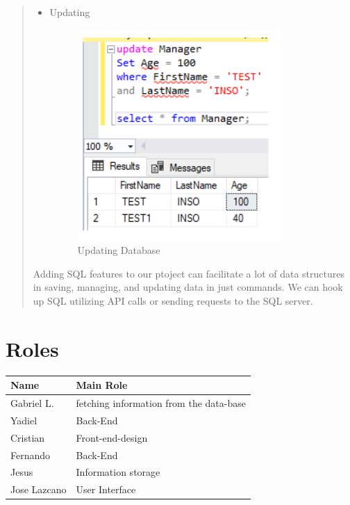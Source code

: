 \documentclass{article}
\begin{document}
\begin{quote}
\begin{itemize}
      \vspace{160}

      \item Updating
      \begin{figure}[h!]
          \centering
          \includegraphics[scale=0.5]{Images/updating.png}
          \caption{Updating Database}
          \label{fig:figure 14}
      \end{figure}

    \end{itemize}

   Adding SQL features to our ptoject can facilitate a lot of data structures in saving, managing, and updating data in just commands. We can hook up SQL utilizing API calls or sending requests to the SQL server.
\end{quote}

\section{Roles}
\vspace{10}
\begin{center}

\begin{tabular}{| l | p{5cm} |}\hline
Name & Main Role \\ \hline
Gabriel L. & fetching information from the data-base\\ \hline
Yadiel     & Back-End\\ \hline
Cristian   & Front-end-design \\ \hline
Fernando   & Back-End \\ \hline
Jesus	   & Information storage\\ \hline
Jose Lazcano  & User Interface \\ \hline
\end{tabular}

\end{center}
\end{document}
